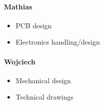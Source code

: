 \documentclass[11pt]{article}
\begin{document}
\paragraph{Mathias}
\begin{itemize}
\item{PCB design}
\item{Electronics handling/design}
\end{itemize}
\paragraph{Wojciech}
\begin{itemize}
\item{Mechanical design}
\item{Technical drawings}
\end{itemize}
\newpage
\let\Section\section 
\def\section*#1{\Section{#1}}


\end{document}
